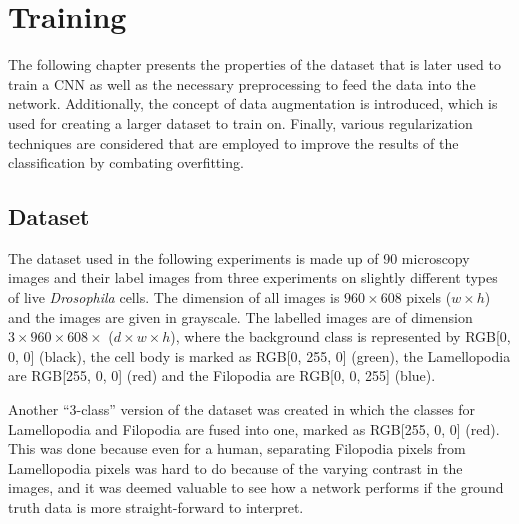 \chapter{Training}
\label{chap:training}

The following chapter presents the properties of the dataset that is later used to train a CNN as well as the necessary preprocessing to feed the data into the network. Additionally, the concept of data augmentation is introduced, which is used for creating a larger dataset to train on. Finally, various regularization techniques are considered that are employed to improve the results of the classification by combating overfitting.

	\section{Dataset}
The dataset used in the following experiments is made up of 90 microscopy images and their label images from three experiments on slightly different types of live \textit{Drosophila} cells. The dimension of all images is $960 \times 608$ pixels ($w \times h$) and the images are given in grayscale. The labelled images are of dimension $3 \times 960 \times 608 \times$ ($d \times w \times h$), where the background class is represented by RGB[0, 0, 0] (black), the cell body is marked as RGB[0, 255, 0] (green), the Lamellopodia are RGB[255, 0, 0] (red) and the Filopodia are RGB[0, 0, 255] (blue).

Another ``3-class'' version of the dataset was created in which the classes for Lamellopodia and Filopodia are fused into one, marked as RGB[255, 0, 0] (red). This was done because even for a human, separating Filopodia pixels from Lamellopodia pixels was hard to do because of the varying contrast in the images, and it was deemed valuable to see how a network performs if the ground truth data is more straight-forward to interpret.\\

